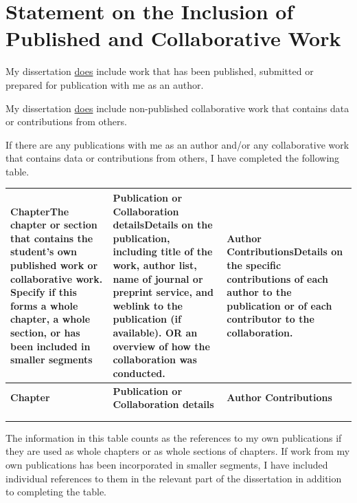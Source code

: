\chapter*{Statement on the Inclusion of Published and Collaborative Work}
\begin{SingleSpace}

My dissertation \underline{does} include work that has been published, submitted or prepared for publication with me as an author.

My dissertation \underline{does} include non-published collaborative work that contains data or contributions from others.

If there are any publications with me as an author and/or any collaborative work that contains data or contributions from others, I have completed the following table. 

\renewcommand{\arraystretch}{1.8}
\begin{center}
\begin{longtable}{@{}>{\raggedright\arraybackslash}p{3.1cm}>{\raggedright\arraybackslash}p{5.9cm}>{\raggedright\arraybackslash}p{5.9cm}@{}}
    \toprule
        \textbf{Chapter}\newline The chapter or section that contains the student's own published work or collaborative work.
        Specify if this forms a whole chapter, a whole section, or has been included in smaller segments 
        & \textbf{Publication or Collaboration details}\newline Details on the publication, including title of the work, author list, name of journal or preprint service, and weblink to the publication (if available).
        OR an overview of how the collaboration was conducted.
        & \textbf{Author Contributions}\newline Details on the specific contributions of each author to the publication or of each contributor to the collaboration. \\
    \midrule
    \endfirsthead

    \toprule
        \textbf{Chapter} & \textbf{Publication or Collaboration details} & \textbf{Author Contributions} \\
    \midrule
    \endhead

    \midrule
    \multicolumn{3}{r}{{Continued on next page}} \\
    \endfoot

    \bottomrule
    \endlastfoot
    

\end{longtable}
\end{center}
\renewcommand{\arraystretch}{1}
\end{SingleSpace}

The information in this table counts as the references to my own publications if they are used as whole chapters or as whole sections of chapters.
If work from my own publications has been incorporated in smaller segments, I have included individual references to them in the relevant part of the dissertation in addition to completing the table.